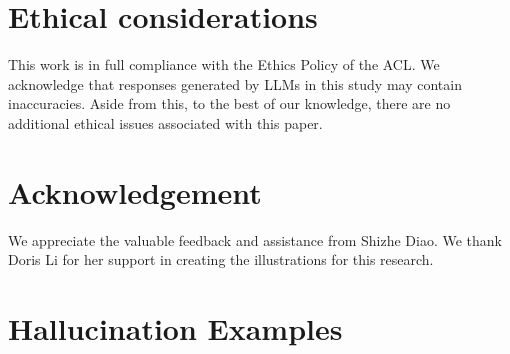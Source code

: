 \documentclass[11pt]{article}
\begin{document}
\section{Ethical considerations}
This work is in full compliance with the Ethics Policy of the ACL. 
We acknowledge that responses generated by LLMs in this study may contain inaccuracies. 
Aside from this, to the best of our knowledge, there are no additional ethical issues associated with this paper.

\section{Acknowledgement}
We appreciate the valuable feedback and assistance from Shizhe Diao. We thank Doris Li for her support in creating the illustrations for this research.




\appendix

\onecolumn
\clearpage
\section{Hallucination Examples}
\label{sec:example}
\end{document}
